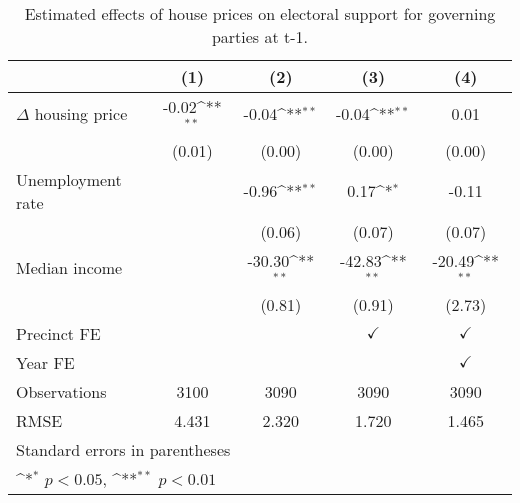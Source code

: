 \begin{table}[htbp]\centering
\def\sym#1{\ifmmode^{#1}\else\(^{#1}\)\fi}
\caption{Estimated effects of house prices on electoral support for governing parties at t-1.} \label{prelagdv}
\begin{tabular}{l*{4}{c}}
\hline\hline
                    &\multicolumn{1}{c}{(1)}        &\multicolumn{1}{c}{(2)}        &\multicolumn{1}{c}{(3)}        &\multicolumn{1}{c}{(4)}        \\
\hline
$\Delta$ housing price&       -0.02\sym{**}&       -0.04\sym{**}&       -0.04\sym{**}&        0.01        \\
                    &      (0.01)        &      (0.00)        &      (0.00)        &      (0.00)        \\
[1em]
Unemployment rate   &                    &       -0.96\sym{**}&        0.17\sym{*} &       -0.11        \\
                    &                    &      (0.06)        &      (0.07)        &      (0.07)        \\
[1em]
Median income       &                    &      -30.30\sym{**}&      -42.83\sym{**}&      -20.49\sym{**}\\
                    &                    &      (0.81)        &      (0.91)        &      (2.73)        \\
[1em]
\hline Precinct FE  &                    &                    &$\checkmark$        &$\checkmark$        \\
[1em]
Year FE             &                    &                    &                    &$\checkmark$        \\
\hline
Observations        &        3100        &        3090        &        3090        &        3090        \\
RMSE                &       4.431        &       2.320        &       1.720        &       1.465        \\
\hline\hline
\multicolumn{5}{l}{\footnotesize Standard errors in parentheses}\\
\multicolumn{5}{l}{\footnotesize \sym{*} \(p<0.05\), \sym{**} \(p<0.01\)}\\
\end{tabular}
\end{table}
